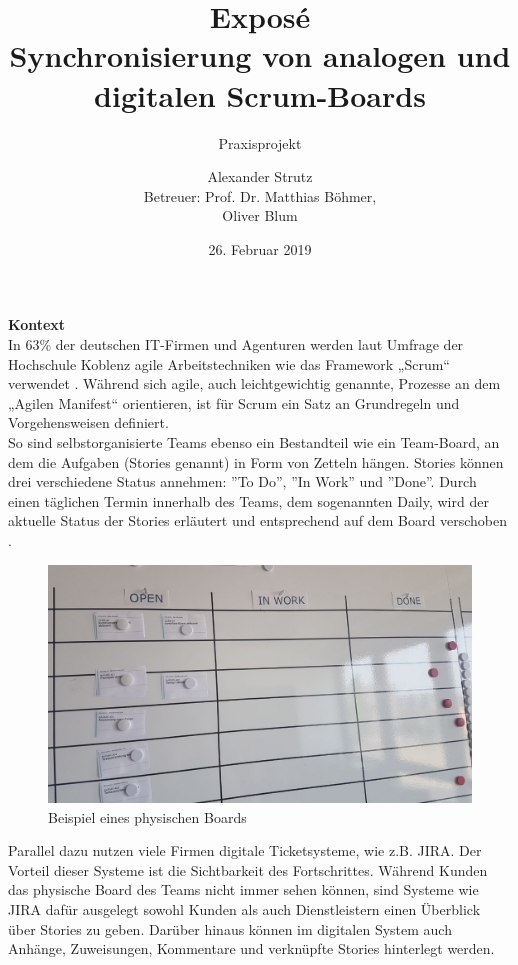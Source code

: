\documentclass[12pt,titlepage]{scrartcl}
\begin{document}
	\begin{titlepage}
		\title{Exposé \\ \glqq Synchronisierung von analogen und digitalen Scrum-Boards\grqq{}} 
		\subtitle{Praxisprojekt}
		\author{Alexander Strutz \vspace{0.5cm}\\ Betreuer: 
		Prof. Dr. Matthias Böhmer,\\Oliver Blum}
 		\date{26. Februar 2019}
		\maketitle
	\end{titlepage}
	\newpage
	\noindent \textbf{Kontext} \\
	In 63\% der deutschen IT-Firmen und Agenturen werden laut Umfrage der Hochschule Koblenz agile Arbeitstechniken wie das Framework „Scrum“ verwendet \cite{hskob}. Während sich agile, auch leichtgewichtig genannte, Prozesse an dem „Agilen Manifest“ orientieren, ist für Scrum ein Satz an Grundregeln und Vorgehensweisen definiert. \\
So sind selbstorganisierte Teams ebenso ein Bestandteil wie ein Team-Board, an dem die Aufgaben (Stories genannt) in Form von Zetteln hängen. Stories können drei verschiedene Status annehmen: ''To Do'', ''In Work'' und ''Done''. Durch einen täglichen Termin innerhalb des Teams, dem sogenannten Daily, wird der aktuelle Status der Stories erläutert und entsprechend auf dem Board verschoben \cite{guide}. \\
\begin{figure}[H] 
  				\centering
    			\includegraphics[height=0.3\textheight]{physicalBoardNear}
  				\caption{Beispiel eines physischen Boards}
  				\label{fig:ANHphysKernNear}
			\end{figure}
\noindent Parallel dazu nutzen viele Firmen digitale Ticketsysteme, wie z.B. JIRA. Der Vorteil dieser Systeme ist die Sichtbarkeit des Fortschrittes. Während Kunden das physische Board des Teams nicht immer sehen können, sind Systeme wie JIRA dafür ausgelegt sowohl Kunden als auch Dienstleistern einen Überblick über Stories zu geben. Darüber hinaus können im digitalen System auch Anhänge, Zuweisungen, Kommentare und verknüpfte Stories hinterlegt werden. \\ \\
\end{document}
